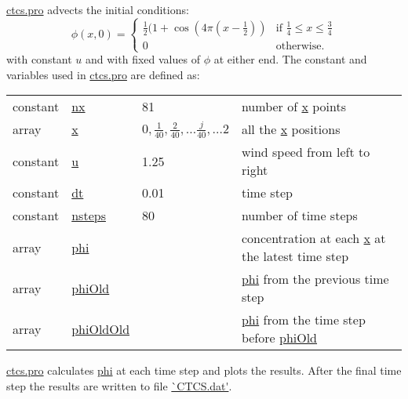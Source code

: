 \url{ctcs.pro} advects the initial conditions:
\begin{equation}
\phi(x,0) =
\begin{cases}
\frac{1}{2}(1 + \cos(4\pi(x-\frac{1}{2})) &
\text{if } \frac{1}{4} \le x \le \frac{3}{4} \\
0 & \text{otherwise.}
\end{cases}
\end{equation}
with constant $u$ and with fixed values of $\phi$ at either end. The constant and variables used in \url{ctcs.pro} are defined as:\\
\begin{tabular}{llll}
constant & \url{nx} & 81 & number of \url{x} points \\
array & \url{x} & $0,\frac{1}{40},\frac{2}{40},\ldots\frac{j}{40},\ldots 2$ & all the \url{x} positions\\
constant & \url{u} & 1.25 & wind speed from left to right \\
constant & \url{dt} & 0.01 & time step\\
constant & \url{nsteps} & 80 & number of time steps\\
array & \url{phi} & & concentration at each \url{x} at the latest time step\\
array & \url{phiOld} && \url{phi} from the previous time step\\
array & \url{phiOldOld} && \url{phi} from the time step before \url{phiOld}\\
\end{tabular}
\url{ctcs.pro} calculates \url{phi} at each time step and plots the results. After the final time step the results are written to file \url{`CTCS.dat'}.

